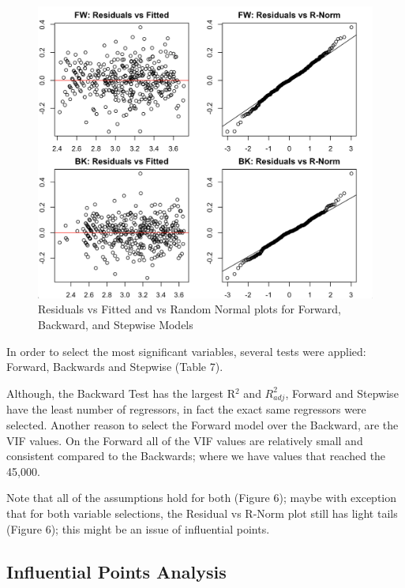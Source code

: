 \documentclass{article}
\newcommand{\mt}[1]{\ensuremath{#1}}
\newcommand{\uf}[2]{#1\mt{^{#2}}}
\begin{document}
\clearpage
\newpage 

\begin{figure}
	\centering
	\includegraphics[width=1\linewidth]{28ti_resfittednorm}
	\caption[Residuals vs Fitted and vs Random Normal plots for Forward, Backward, and Stepwise Models]
	{Residuals vs Fitted and vs Random Normal plots for Forward, Backward, and Stepwise Models}
\end{figure}

\clearpage
\newpage 

In order to select the most significant variables, several tests were applied: Forward, Backwards and Stepwise (Table 7).

Although, the Backward Test has the largest \uf{R}{2} and $R^2_{adj}$, Forward and Stepwise have the least number of regressors, in fact the exact same regressors were selected. Another reason to select the Forward model over the Backward, are the VIF values. On the Forward all of the VIF values are relatively small and consistent compared to the Backwards; where we have values that reached the 45,000.

Note that all of the assumptions hold for both (Figure 6); maybe with exception that for both variable selections, the Residual vs R-Norm plot still has light tails (Figure 6); this might be an issue of influential points.

\clearpage
\newpage 

\subsection{Influential Points Analysis}
\end{document}
